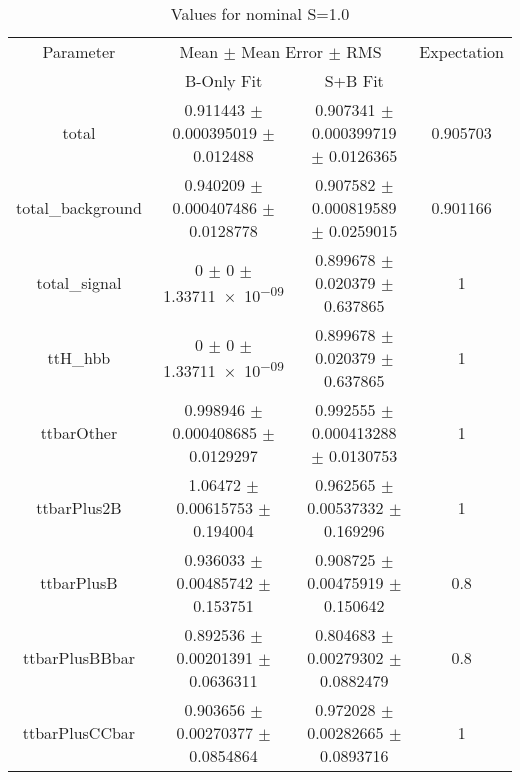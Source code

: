 \begin{table}
\centering
\caption{Values for nominal S=1.0}
\begin{tabular}{cccc}
\toprule
Parameter & \multicolumn{2}{c}{Mean $\pm$ Mean Error $\pm$ RMS} & Expectation\\
 & B-Only Fit & S+B Fit & \\
\midrule
total & \num{0.911443} $\pm$ \num{0.000395019} $\pm$ \num{0.012488} & \num{0.907341} $\pm$ \num{0.000399719} $\pm$ \num{0.0126365} & \num{0.905703}\\
total\_background & \num{0.940209} $\pm$ \num{0.000407486} $\pm$ \num{0.0128778} & \num{0.907582} $\pm$ \num{0.000819589} $\pm$ \num{0.0259015} & \num{0.901166}\\
total\_signal & \num{0} $\pm$ \num{0} $\pm$ \num{1.33711e-09} & \num{0.899678} $\pm$ \num{0.020379} $\pm$ \num{0.637865} & \num{1}\\
ttH\_hbb & \num{0} $\pm$ \num{0} $\pm$ \num{1.33711e-09} & \num{0.899678} $\pm$ \num{0.020379} $\pm$ \num{0.637865} & \num{1}\\
ttbarOther & \num{0.998946} $\pm$ \num{0.000408685} $\pm$ \num{0.0129297} & \num{0.992555} $\pm$ \num{0.000413288} $\pm$ \num{0.0130753} & \num{1}\\
ttbarPlus2B & \num{1.06472} $\pm$ \num{0.00615753} $\pm$ \num{0.194004} & \num{0.962565} $\pm$ \num{0.00537332} $\pm$ \num{0.169296} & \num{1}\\
ttbarPlusB & \num{0.936033} $\pm$ \num{0.00485742} $\pm$ \num{0.153751} & \num{0.908725} $\pm$ \num{0.00475919} $\pm$ \num{0.150642} & \num{0.8}\\
ttbarPlusBBbar & \num{0.892536} $\pm$ \num{0.00201391} $\pm$ \num{0.0636311} & \num{0.804683} $\pm$ \num{0.00279302} $\pm$ \num{0.0882479} & \num{0.8}\\
ttbarPlusCCbar & \num{0.903656} $\pm$ \num{0.00270377} $\pm$ \num{0.0854864} & \num{0.972028} $\pm$ \num{0.00282665} $\pm$ \num{0.0893716} & \num{1}\\
\bottomrule
\end{tabular}
\end{table}